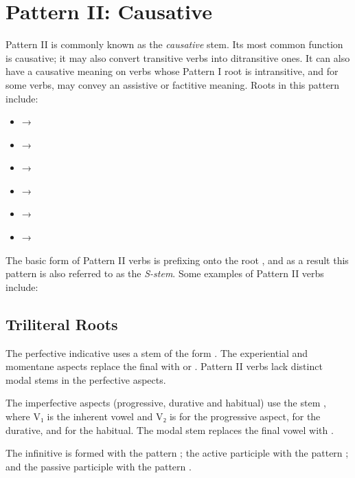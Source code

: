 \documentclass[grammar]{subfiles}
\begin{document}
\clearpage
\section{Pattern II: Causative}
\label{sec:vm_pattern_ii}

Pattern II is commonly known as the \emph{causative} stem.  Its most common
function is causative; it may also convert transitive verbs into ditransitive
ones.  It can also have a causative meaning on verbs whose Pattern I root is
intransitive, and for some verbs, may convey an assistive or factitive meaning.
Roots in this pattern include: 

\begin{itemize}
  \item {} → 
  \item {} → 
  \item {} → 
  \item {} → 
  \item {} → 
  \item {} → 
\end{itemize}


The basic form of Pattern II verbs is prefixing  onto the root
, and as a result this pattern is also referred to as the
\emph{S-stem}.  Some examples of Pattern II verbs include:

\subsection{Triliteral Roots}
\label{ssec:vm_ii_triliteral}

The perfective indicative uses a stem of the form . The
experiential and momentane aspects replace the final  with  or
.  Pattern II verbs lack distinct modal stems in the perfective aspects.  

The imperfective aspects (progressive, durative and  habitual) use the stem
, where V₁ is the inherent vowel and V₂ is  for the
progressive aspect,  for the durative, and  for the habitual.
The modal stem replaces the final vowel with . 

The infinitive is formed with the pattern ; the active participle
with the pattern ; and the passive participle with the pattern
.
\end{document}
